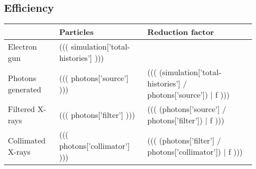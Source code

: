 \documentclass[12pt]{article}
\begin{document}
\subsection{Efficiency}

\begin{table}[H]
\begin{tabular}{l l l}
	& Particles & Reduction factor \\
	\hline
	Electron gun & ((( simulation['total-histories'] ))) & \\
	Photons generated & ((( photons['source'] ))) & ((( (simulation['total-histories'] / photons['source']) | f ))) \\
	Filtered X-rays & ((( photons['filter'] ))) & ((( (photons['source'] / photons['filter']) | f ))) \\
	Collimated X-rays & ((( photons['collimator'] ))) & ((( (photons['filter'] / photons['collimator']) | f )))
\end{tabular}
\end{table}
\end{document}
